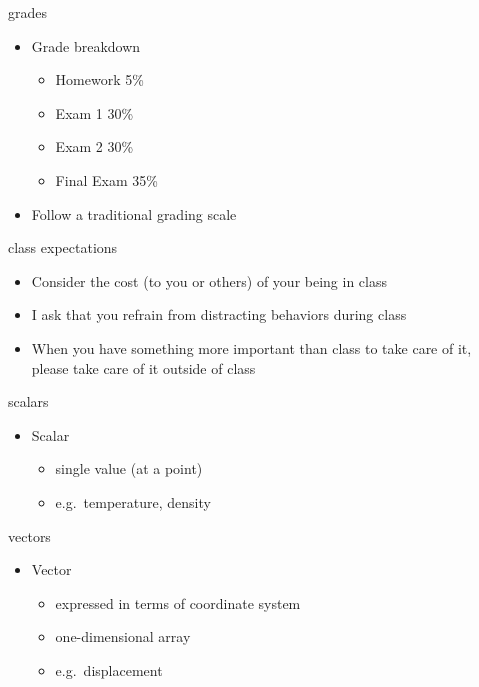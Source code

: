 \documentclass[
  letterpaper,
  ignorenonframetext,
  aspectratio=43,
  handout,
  12pt]{beamer}
\providecommand{\tightlist}{%
  \setlength{\itemsep}{0pt}\setlength{\parskip}{0pt}}
\providecommand{\tightlist}{%
\setlength{\itemsep}{0pt}\setlength{\parskip}{0pt}}
\begin{document}
\begin{frame}{grades}
\protect\hypertarget{grades}{}
\begin{itemize}
\tightlist
\item
  Grade breakdown

  \begin{itemize}
  \tightlist
  \item
    Homework 5\%
  \item
    Exam 1 30\%
  \item
    Exam 2 30\%
  \item
    Final Exam 35\%
  \end{itemize}
\item
  Follow a traditional grading scale
\end{itemize}
\end{frame}

\begin{frame}{class expectations}
\protect\hypertarget{class-expectations}{}
\begin{itemize}
\tightlist
\item
  Consider the cost (to you or others) of your being in class
\item
  I ask that you refrain from distracting behaviors during class
\item
  When you have something more important than class to take care of it,
  please take care of it outside of class
\end{itemize}
\end{frame}


\begin{frame}{scalars}
\protect\hypertarget{scalars}{}
\begin{itemize}
\tightlist
\item
  Scalar

  \begin{itemize}
  \tightlist
  \item
    single value (at a point)
  \item
    e.g.~temperature, density
  \end{itemize}
\end{itemize}
\end{frame}

\begin{frame}{vectors}
\protect\hypertarget{vectors}{}
\begin{itemize}
\tightlist
\item
  Vector

  \begin{itemize}
  \tightlist
  \item
    expressed in terms of coordinate system
  \item
    one-dimensional array
  \item
    e.g.~displacement
  \end{itemize}
\end{itemize}
\end{frame}
\end{document}
